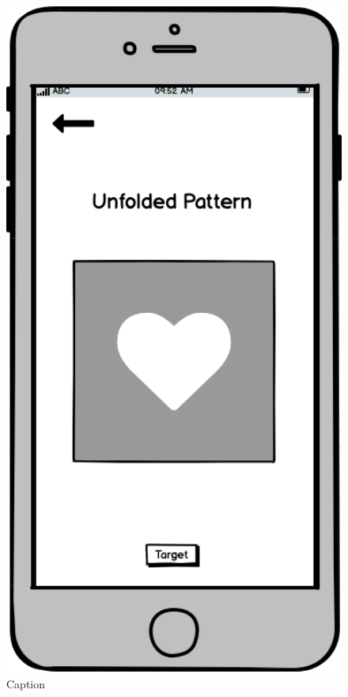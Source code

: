\documentclass[11pt]{article}
\begin{document}
            \begin{figure}
                \begin{minipage}[c]{0.65\textwidth}
                \caption{Caption}
                \label{fig:revealWithOverlay}
                \end{minipage}\hfill
                \begin{minipage}[c]{0.35\textwidth}
                \includegraphics[width=1\textwidth]{Images/Prototype/prototypeRevealWithOverlay.png}
                \end{minipage}
            \end{figure}
                        \clearpage
            
\end{document}
